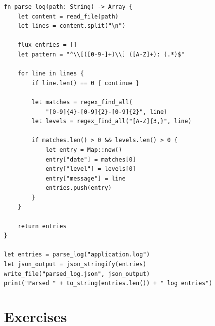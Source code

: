 \begin{lstlisting}[language=Lattice, caption={A log parser using regex}]
fn parse_log(path: String) -> Array {
    let content = read_file(path)
    let lines = content.split("\n")

    flux entries = []
    let pattern = "^\\[([0-9-]+)\\] ([A-Z]+): (.*)$"

    for line in lines {
        if line.len() == 0 { continue }

        let matches = regex_find_all(
            "[0-9]{4}-[0-9]{2}-[0-9]{2}", line)
        let levels = regex_find_all("[A-Z]{3,}", line)

        if matches.len() > 0 && levels.len() > 0 {
            let entry = Map::new()
            entry["date"] = matches[0]
            entry["level"] = levels[0]
            entry["message"] = line
            entries.push(entry)
        }
    }

    return entries
}

let entries = parse_log("application.log")
let json_output = json_stringify(entries)
write_file("parsed_log.json", json_output)
print("Parsed " + to_string(entries.len()) + " log entries")
\end{lstlisting}

\section*{Exercises}\label{sec:time-crypto-os-exercises}

